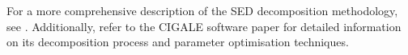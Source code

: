 For a more comprehensive description of the SED decomposition methodology, see \cite{cowley_decoupled_2018}. Additionally, refer to the CIGALE software paper \citep{boquien_cigale_2019} for detailed information on its decomposition process and parameter optimisation techniques.





